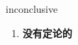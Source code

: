 
\begin{frame}
{\huge inconclusive}
\begin{center}
\begin{enumerate}\Large
  \item \textbf{没有定论的}
\end{enumerate}
\end{center}
\end{frame}
